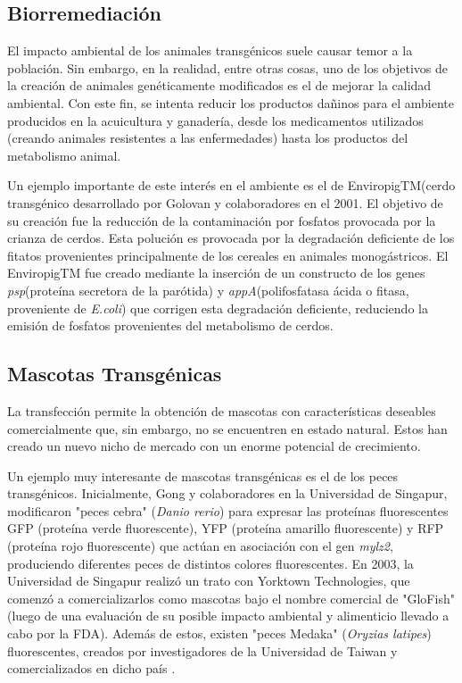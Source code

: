 \documentclass[fleqn,10pt]{SelfArx} %
\begin{document}
\subsection{Biorremediación}

El impacto ambiental de los animales transgénicos suele causar temor a la población\cite{Verhoog2003294}. Sin embargo, en la realidad, entre otras cosas, uno de los objetivos de la creación de animales genéticamente modificados es el de mejorar la calidad ambiental. Con este fin, se intenta reducir los productos dañinos para el ambiente producidos en la acuicultura y ganadería, desde los medicamentos utilizados (creando animales resistentes a las enfermedades) hasta los productos del metabolismo animal\cite{Koszarycz2004, niemann2007transgenic}. 

Un ejemplo importante de este interés en el ambiente es el de EnviropigTM(cerdo transgénico desarrollado por Golovan y colaboradores en el 2001. El objetivo de su creación fue la reducción de la contaminación por fosfatos provocada por la crianza de cerdos. Esta polución es provocada por la degradación deficiente de los  fitatos provenientes principalmente de los cereales en animales monogástricos. El EnviropigTM fue creado mediante la inserción de un constructo de los genes \textit{psp}(proteína secretora de la parótida) y \textit{appA}(polifosfatasa ácida o fitasa, proveniente de \textit{E.coli}) que corrigen esta degradación deficiente, reduciendo la emisión de fosfatos provenientes del metabolismo de cerdos\cite{golovan2001transgenic, golovan2001pigs,niemann2007transgenic}.


\subsection{Mascotas Transgénicas}
    
    La transfección permite la obtención de mascotas con características deseables comercialmente que, sin embargo, no se encuentren en estado natural. Estos han creado un nuevo nicho de mercado con un enorme potencial de crecimiento. 
    
    Un ejemplo muy interesante de mascotas transgénicas es el de los peces transgénicos. Inicialmente, Gong y colaboradores en la Universidad de Singapur, modificaron "peces cebra" (\textit{Danio rerio}) para expresar las proteínas fluorescentes GFP (proteína verde fluorescente), YFP (proteína amarillo fluorescente) y RFP (proteína rojo fluorescente) que actúan en asociación con el gen \textit{mylz2}, produciendo diferentes peces de distintos colores fluorescentes. En 2003, la Universidad de Singapur realizó un trato con Yorktown Technologies, que comenzó a comercializarlos como mascotas bajo el nombre comercial de "GloFish" (luego de una evaluación de su posible impacto ambiental y alimenticio llevado a cabo por la FDA)\cite{food2003fda}. Además de estos, existen "peces Medaka" (\textit{Oryzias latipes}) fluorescentes, creados por investigadores de la Universidad de Taiwan y comercializados en dicho país \cite{gong2003development, espinoza2012reproduccion, scotto2013primera}.
    
\end{document}
